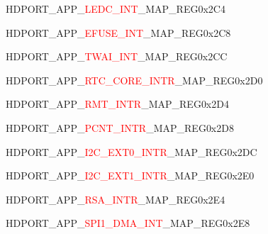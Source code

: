 \begin{register}{H}{DPORT\_APP\_\textcolor{red}{LEDC\_INT}\_MAP\_REG}{0x2C4}\label{regdesc:APPLEDCINTMAPREG}
\end{register}
\vspace{-3em}
\begin{register}{H}{DPORT\_APP\_\textcolor{red}{EFUSE\_INT}\_MAP\_REG}{0x2C8}\label{regdesc:APPEFUSEINTMAPREG}
\end{register}
\vspace{-3em}
\begin{register}{H}{DPORT\_APP\_\textcolor{red}{TWAI\_INT}\_MAP\_REG}{0x2CC}\label{regdesc:APPCANINTMAPREG}
\end{register}
\vspace{-3em}
\begin{register}{H}{DPORT\_APP\_\textcolor{red}{RTC\_CORE\_INTR}\_MAP\_REG}{0x2D0}\label{regdesc:APPRTCCOREINTRMAPREG}
\end{register}
\vspace{-3em}
\begin{register}{H}{DPORT\_APP\_\textcolor{red}{RMT\_INTR}\_MAP\_REG}{0x2D4}\label{regdesc:APPRMTINTRMAPREG}
\end{register}
\vspace{-3em}
\begin{register}{H}{DPORT\_APP\_\textcolor{red}{PCNT\_INTR}\_MAP\_REG}{0x2D8}\label{regdesc:APPPCNTINTRMAPREG}
\end{register}
\vspace{-3em}
\begin{register}{H}{DPORT\_APP\_\textcolor{red}{I2C\_EXT0\_INTR}\_MAP\_REG}{0x2DC}\label{regdesc:APPI2CEXT0INTRMAPREG}
\end{register}
\vspace{-3em}
\begin{register}{H}{DPORT\_APP\_\textcolor{red}{I2C\_EXT1\_INTR}\_MAP\_REG}{0x2E0}\label{regdesc:APPI2CEXT1INTRMAPREG}
\end{register}
\vspace{-3em}
\begin{register}{H}{DPORT\_APP\_\textcolor{red}{RSA\_INTR}\_MAP\_REG}{0x2E4}\label{regdesc:APPRSAINTRMAPREG}
\end{register}
\vspace{-3em}
\begin{register}{H}{DPORT\_APP\_\textcolor{red}{SPI1\_DMA\_INT}\_MAP\_REG}{0x2E8}\label{regdesc:APPSPI1DMAINTMAPREG}
\end{register}
\vspace{-3em}
